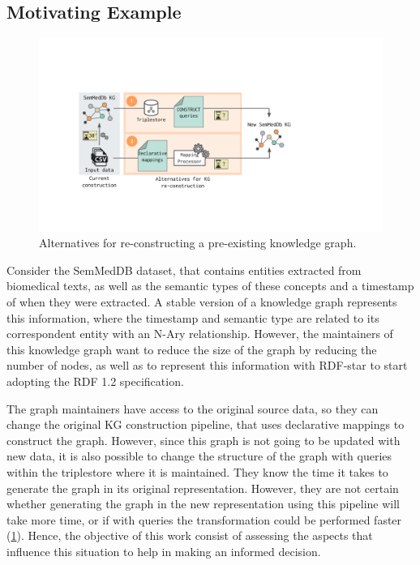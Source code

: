 \subsection{Motivating Example}
\label{sec:chp6-1_mot-example}

\begin{figure}[t!]
    \centering
    \includegraphics[width=1\linewidth]{figures/chp6-1_motivating-example.pdf}
    \caption{Alternatives for re-constructing a pre-existing knowledge graph.}
    \label{fig:chp6-1_mot-example}
\end{figure}

Consider the SemMedDB dataset, that contains entities extracted from biomedical texts, as well as the semantic types of these concepts and a timestamp of when they were extracted. A stable version of a knowledge graph represents this information, where the timestamp and semantic type are related to its correspondent entity with an N-Ary relationship. However, the maintainers of this knowledge graph want to reduce the size of the graph by reducing the number of nodes, as well as to represent this information with RDF-star to start adopting the RDF 1.2 specification.

The graph maintainers have access to the original source data, so they can change the original KG construction pipeline, that uses declarative mappings to construct the graph. However, since this graph is not going to be updated with new data, it is also possible to change the structure of the graph with queries within the triplestore where it is maintained. They know the time it takes to generate the graph in its original representation. However, they are not certain whether generating the graph in the new representation using this pipeline will take more time, or if with queries the transformation could be performed faster (\cref{fig:chp6-1_mot-example}). Hence, the objective of this work consist of assessing the aspects that influence this situation to help in making an informed decision.


